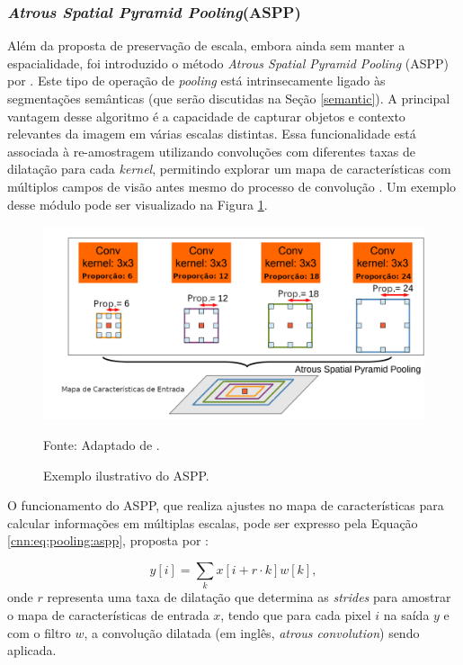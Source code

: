 \subsubsection{\textit{Atrous Spatial Pyramid Pooling}(ASPP)}
\label{cnn:pooling:aspp}
Além da proposta de preservação de escala, embora ainda sem manter a espacialidade, foi introduzido o método \textit{Atrous Spatial Pyramid Pooling} (ASPP) por \cite{Chen2018}. Este tipo de operação de \textit{pooling} está intrinsecamente ligado às segmentações semânticas \citep{Mohan2020} (que serão discutidas na Seção \ref{semantic}). A principal vantagem desse algoritmo é a capacidade de capturar objetos e contexto relevantes da imagem em várias escalas distintas. Essa funcionalidade está associada à re-amostragem utilizando convoluções com diferentes taxas de dilatação para cada \textit{kernel}, permitindo explorar um mapa de características com múltiplos campos de visão antes mesmo do processo de convolução \citep{Chen2018}. Um exemplo desse módulo pode ser visualizado na Figura \ref{cnn:fig:aspp}.

\begin{figure}[H]
    \centering
    \caption{Exemplo ilustrativo do ASPP.}
    \includegraphics[width=1\textwidth]{recursos/imagens/project/aspp.png}
    \label{cnn:fig:aspp}

    Fonte: Adaptado de \cite{Chen2018}.
\end{figure}

O funcionamento do ASPP, que realiza ajustes no mapa de características para calcular informações em múltiplas escalas, pode ser expresso pela Equação \ref{cnn:eq:pooling:aspp}, proposta por \cite{Chen2018}:

\begin{equation}
    \label{cnn:eq:pooling:aspp}
    y[i] = \sum_{k}x[i + r \cdot k]w [k],
\end{equation}
onde $r$ representa uma taxa de dilatação que determina as \textit{strides} para amostrar o mapa de características de entrada $x$, tendo que para cada pixel $i$ na saída $y$ e com o filtro $w$, a convolução dilatada (em inglês, \textit{atrous convolution}) sendo aplicada.

